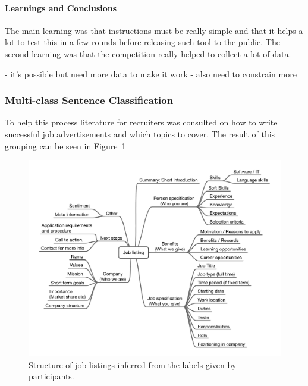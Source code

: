 \paragraph{Learnings and Conclusions}
\label{par:Learnings and Conclusions}

The main learning was that instructions must be really simple and that it helps a lot to test this in a few rounds before releasing such tool to the public. The second learning was that the competition really helped to collect a lot of data.

- it's possible but need more data to make it work
- also need to constrain more



\subsubsection{Multi-class Sentence Classification}
\label{subs:Multi-class Sentence Classification}

To help this process literature for recruiters was consulted on how to write successful job advertisements and which topics to cover. The result of this grouping can be seen in Figure~\ref{fig:job-listing-structure}


\begin{figure}[h]
  \centering
  \includegraphics[width=\textwidth]{img/job-listing-structure.pdf}
  \caption{Structure of job listings inferred from the labels given by participants.}
\label{fig:job-listing-structure}
\end{figure}

